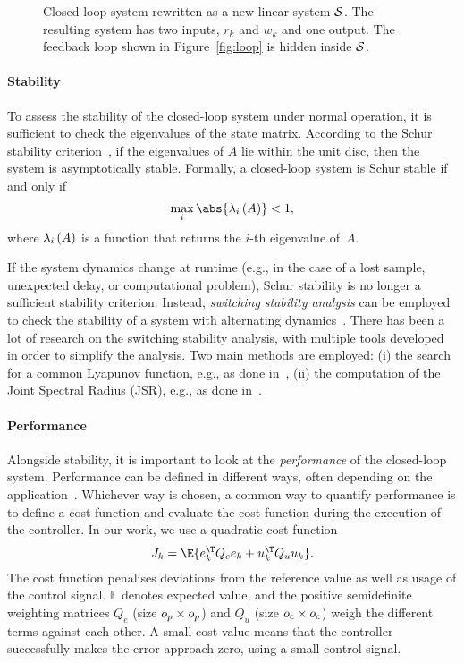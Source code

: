 \begin{figure}[t]
\centering

\caption{Closed-loop system rewritten as a new linear system $\mathcal{S}$.
    The resulting system has two inputs, $r_k$ and $w_k$ and one output.
    The feedback loop shown in Figure~\ref{fig:loop} is hidden inside $\mathcal{S}$.}
\label{fig:closedloop}
\end{figure}

\paragraph*{Stability}

To assess the stability of the closed-loop system under normal operation, it is sufficient to check the eigenvalues of the state matrix. 
According to the Schur stability criterion~\cite{Astrom:1997}, if the eigenvalues of $A$ lie within the unit disc, then the system is asymptotically stable. 
Formally, a closed-loop system is Schur stable if and only if
%
\begin{equation}
    \label{eq:schur}
    \max_i{\abs{\eig{i}{A}}} < 1,
\end{equation}
%
where $\lambda_{i}\left( A \right)$ is a function that returns the $i$-th eigenvalue of~$A$.

If the system dynamics change at runtime (e.g., in the case of a lost sample, unexpected delay, or computational problem), Schur stability is no longer a sufficient stability criterion.
Instead, \emph{switching stability analysis} can be employed to check the stability of a system with alternating dynamics~\cite{Jungers2009}.
There has been a lot of research on the switching stability analysis, with multiple tools developed in order to simplify the analysis.
Two main methods are employed: (i) the search for a common Lyapunov function, e.g., as done in~\cite{Linsenmayer:2017}, (ii) the computation of the Joint Spectral Radius (JSR), e.g., as done in~\cite{Maggio:2020,Jungers:2014}.

\paragraph*{Performance}

Alongside stability, it is important to look at the \emph{performance} of the closed-loop system.
Performance can be defined in different ways, often depending on the application~\cite{Astrom:2006}.
Whichever way is chosen, a common way to quantify performance is to define a cost function and evaluate the cost function during the execution of the controller.
In our work, we use a quadratic cost function
%
\begin{equation}
    \label{eq:cost}
    J_k = \E{e_k^\T Q_e e_k + u_k^\T Q_u u_k}.
\end{equation}
%
The cost function penalises deviations from the reference value as well as usage of the control signal.
$\mathbb{E}$ denotes expected value, and the positive semidefinite weighting matrices $Q_e$ (size $o_p \times o_p$) and $Q_u$ (size $o_c \times o_c$) weigh the different terms against each other.
A small cost value means that the controller successfully makes the error approach zero, using a small control signal.


